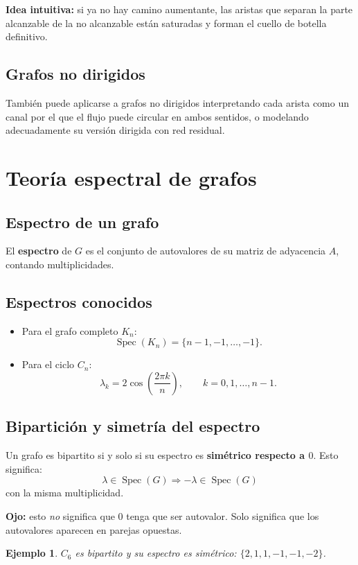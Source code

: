 \documentclass[11pt,a4paper]{article}
\newtheorem*{ej}{Ejemplo}
\begin{document}
\textbf{Idea intuitiva:} si ya no hay camino aumentante, las aristas que separan la parte alcanzable de la no alcanzable están saturadas y forman el cuello de botella definitivo.

\subsection{Grafos no dirigidos}
También puede aplicarse a grafos no dirigidos interpretando cada arista como un canal por el que el flujo puede circular en ambos sentidos, o modelando adecuadamente su versión dirigida con red residual.

\section{Teoría espectral de grafos}

\subsection{Espectro de un grafo}
El \textbf{espectro} de $G$ es el conjunto de autovalores de su matriz de adyacencia $A$, contando multiplicidades.

\subsection{Espectros conocidos}
\begin{itemize}
    \item Para el grafo completo $K_n$:
    \[
    \operatorname{Spec}(K_n)=\{n-1,-1,\dots,-1\}.
    \]
    \item Para el ciclo $C_n$:
    \[
    \lambda_k=2\cos\left(\frac{2\pi k}{n}\right),\qquad k=0,1,\dots,n-1.
    \]
\end{itemize}

\subsection{Bipartición y simetría del espectro}
Un grafo es bipartito si y solo si su espectro es \textbf{simétrico respecto a $0$}. Esto significa:
\[
\lambda\in \operatorname{Spec}(G) \Longrightarrow -\lambda\in \operatorname{Spec}(G)
\]
con la misma multiplicidad.

\textbf{Ojo:} esto \emph{no} significa que $0$ tenga que ser autovalor. Solo significa que los autovalores aparecen en parejas opuestas.

\begin{ej}
$C_6$ es bipartito y su espectro es simétrico: $\{2,1,1,-1,-1,-2\}$.
\end{ej}
\end{document}
